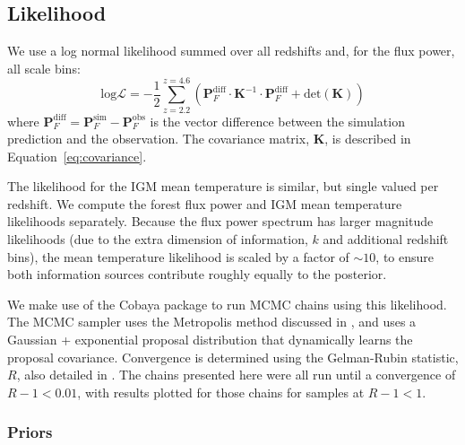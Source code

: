 \subsection{Likelihood}\label{sec:likelihood}

We use a log normal likelihood summed over all redshifts and, for the flux power, all scale bins:
\begin{equation}
    \mathrm{log}\mathcal{L} = -\frac{1}{2} \sum_{z=2.2}^{z=4.6} \left(\boldsymbol{P}_F^{\mathrm{diff}} \cdot \boldsymbol{K}^{-1} \cdot \boldsymbol{P}_F^{\mathrm{diff}} + \mathrm{det}(\boldsymbol{K})\right)
    \label{eq:likelihood}
\end{equation}
where $\boldsymbol{P}_F^{\mathrm{diff}} = \boldsymbol{P}_F^{\mathrm{sim}} - \boldsymbol{P}_F^{\mathrm{obs}}$ is the vector difference between the simulation prediction and the observation. The covariance matrix, $\boldsymbol{K}$, is described in Equation~\ref{eq:covariance}. 

The likelihood for the IGM mean temperature is similar, but single valued per redshift. We compute the \lya forest flux power and IGM mean temperature likelihoods separately. Because the flux power spectrum has larger magnitude likelihoods (due to the extra dimension of information, $k$ and additional redshift bins), the mean temperature likelihood is scaled by a factor of $\sim 10$, to ensure both information sources contribute roughly equally to the posterior.

We make use of the Cobaya package \cite{2021JCAP...05..057T, 2019ascl.soft10019T, 2013PhRvD..87j3529L, 2002PhRvD..66j3511L} to run MCMC chains using this likelihood.
The MCMC sampler uses the Metropolis method discussed in \cite{2013PhRvD..87j3529L}, and uses a Gaussian + exponential proposal distribution that dynamically learns the proposal covariance.
Convergence is determined using the Gelman-Rubin statistic, $R$, also detailed in \cite{2013PhRvD..87j3529L}.
The chains presented here were all run until a convergence of $R-1 < 0.01$, with results plotted for those chains for samples at $R-1 < 1$.

\subsubsection{Priors}

